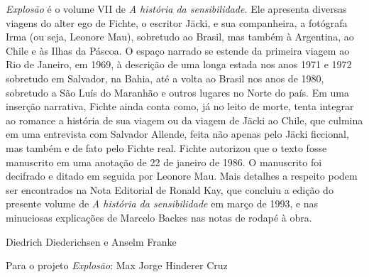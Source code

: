 \emph{Explosão} é o volume VII de \emph{A história da sensibilidade.}
Ele apresenta diversas viagens do alter ego de Fichte, o escritor Jäcki,
e sua companheira, a fotógrafa Irma (ou seja, Leonore Mau), sobretudo ao
Brasil, mas também à Argentina, ao Chile e às Ilhas da Páscoa. O espaço
narrado se estende da primeira viagem ao Rio de Janeiro, em 1969, à
descrição de uma longa estada nos anos 1971 e 1972 sobretudo em
Salvador, na Bahia, até a volta ao Brasil nos anos de 1980, sobretudo a
São Luís do Maranhão e outros lugares no Norte do país. Em uma inserção
narrativa, Fichte ainda conta como, já no leito de morte, tenta integrar
ao romance a história de sua viagem ou da viagem de Jäcki ao Chile, que
culmina em uma entrevista com Salvador Allende, feita não apenas pelo
Jäcki ficcional, mas também e de fato pelo Fichte real. Fichte autorizou
que o texto fosse manuscrito em uma anotação de 22 de janeiro de 1986. O
manuscrito foi decifrado e ditado em seguida por Leonore Mau. Mais
detalhes a respeito podem ser encontrados na Nota Editorial de Ronald
Kay, que concluiu a edição do presente volume de \emph{A história da
sensibilidade} em março de 1993, e nas minuciosas explicações de Marcelo
Backes nas notas de rodapé à obra.

Diedrich Diederichsen e Anselm Franke

Para o projeto \emph{Explosão}: Max Jorge Hinderer Cruz
